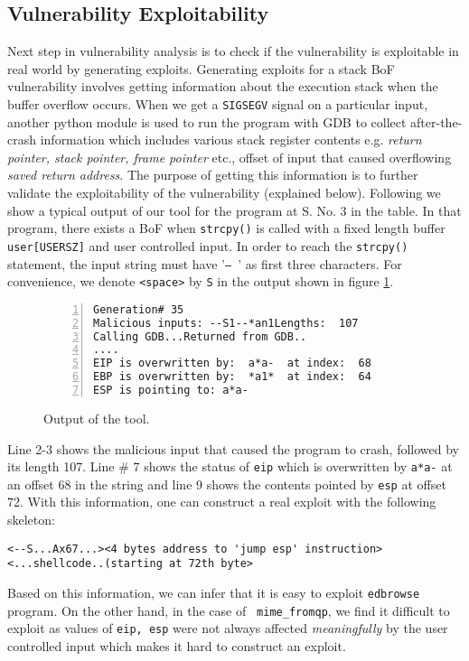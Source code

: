\subsection{Vulnerability Exploitability}\label{sec:vulnExploit}
Next step in vulnerability analysis is to check if the vulnerability is exploitable in real world by generating exploits. Generating exploits for a stack BoF vulnerability involves getting information about the execution stack when the buffer overflow occurs. When we get a \texttt{SIGSEGV} signal on a particular input, another python module is used to run the program  with GDB to collect after-the-crash information which includes various stack register contents e.g. \emph{return pointer, stack pointer, frame pointer} etc., offset of input that caused overflowing \emph{saved return address}. The purpose of getting this information is to further validate the exploitability of the vulnerability (explained below). Following we show a typical output of our tool for the program at S. No. 3 in the table. In that program, there exists a BoF when \texttt{strcpy()} is called with a fixed length buffer \texttt{user[USERSZ]} and user controlled input. In order to reach the \texttt{strcpy()} statement, the input string must have '\texttt{-- }' as first three characters. For convenience, we denote \texttt{<space>} by \texttt{S} in the output shown in figure \ref{fig:out}.
\begin{figure}[h]
 \begin{Verbatim}[frame=single,numbers=left,fontsize=\scriptsize]
Generation# 35
Malicious inputs: --S1--*an1Lengths:  107
Calling GDB...Returned from GDB..
....
EIP is overwritten by:  a*a-  at index:  68
EBP is overwritten by:  *a1*  at index:  64
ESP is pointing to: a*a-\end{Verbatim}
\caption{Output of the tool.}\label{fig:out}
\end{figure}
Line 2-3 shows the malicious input that caused the program to crash, followed by its length 107. Line \# 7 shows the status of \texttt{eip} which is overwritten by \texttt{a*a-} at an offset 68 in the string and line 9 shows the contents pointed by \texttt{esp} at offset 72. With this information, one can construct a real exploit with the following skeleton:
\begin{Verbatim}[fontsize=\small]
<--S...Ax67...><4 bytes address to 'jump esp' instruction>
<...shellcode..(starting at 72th byte>
\end{Verbatim}
Based on this information, we can infer that it is easy to exploit \texttt{edbrowse} program. On the other hand, in the case of \texttt{ mime\_fromqp}, we find it difficult to exploit as values of \texttt{eip, esp} were not always affected \emph{meaningfully} by the user controlled input which makes it hard to construct an  exploit.
